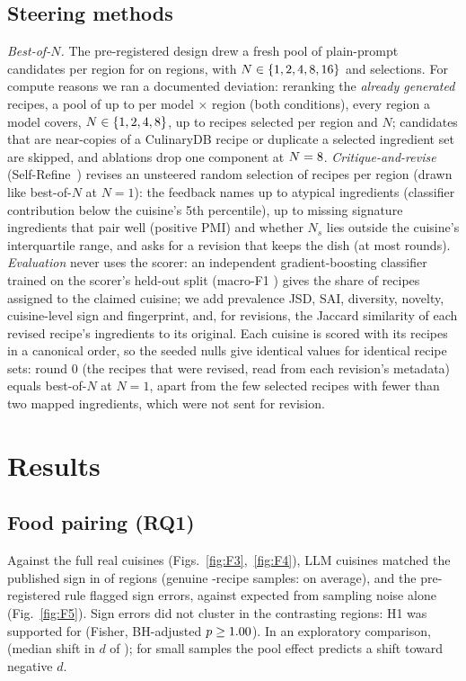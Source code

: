\documentclass[conference]{IEEEtran}
\newcommand{\Ns}{N_s}
\begin{document}
\subsection{Steering methods}
\emph{Best-of-$N$.} The pre-registered design drew a fresh pool of \NSteerPrePool{} plain-prompt candidates per region for \NSteerPreModels{} on \NSteerPreRegions{} regions, with $N\in\{1, 2, 4, 8, 16\}$ and \NSteerPreSelected{} selections. For compute reasons we ran a documented deviation: reranking the \emph{already generated} recipes, a pool of up to \NBonPoolMax{} per model $\times$ region (both conditions), every region a model covers, $N\in\{1, 2, 4, 8\}$, up to \NBonSelectedMax{} recipes selected per region and $N$; candidates that are near-copies of a CulinaryDB recipe or duplicate a selected ingredient set are skipped, and ablations drop one component at $N=8$.
\emph{Critique-and-revise} (Self-Refine~\cite{madaan2023}) revises an unsteered random selection of recipes per region (drawn like best-of-$N$ at $N=1$): the feedback names up to \NFeedbackItems{} atypical ingredients (classifier contribution below the cuisine's 5th percentile), up to \NFeedbackItems{} missing signature ingredients that pair well (positive PMI) and whether $\Ns$ lies outside the cuisine's interquartile range, and asks for a revision that keeps the dish (at most \NRoundsMax{} rounds).
\emph{Evaluation} never uses the scorer: an independent gradient-boosting classifier trained on the scorer's held-out split (macro-F1 \NEvalClfFOne) gives the share of recipes assigned to the claimed cuisine; we add prevalence JSD, SAI, diversity, novelty, cuisine-level sign and fingerprint, and, for revisions, the Jaccard similarity of each revised recipe's ingredients to its original. Each cuisine is scored with its recipes in a canonical order, so the seeded nulls give identical values for identical recipe sets: round 0 (the recipes that were revised, read from each revision's metadata) equals best-of-$N$ at $N=1$, apart from the few selected recipes with fewer than two mapped ingredients, which were not sent for revision.

\section{Results}
\subsection{Food pairing (RQ1)}
Against the full real cuisines (Figs.~\ref{fig:F3},~\ref{fig:F4}), LLM cuisines matched the published sign in \NSignAgreeRange{} of regions (genuine \NLLMN-recipe samples: \NRefSignMatchPct{} on average), and the pre-registered rule flagged \NSignErrText{} sign errors, against \NSignErrExpectedText{} expected from sampling noise alone (Fig.~\ref{fig:F5}). Sign errors did not cluster in the contrasting regions: H1 was supported for \NHOneFisherSupport{} (Fisher, BH-adjusted $p\geq1.00$). In an exploratory comparison, \NHOneExpDirection{} (median shift in $d$ of \NHOneExpShiftRange); for small samples the pool effect predicts a shift toward negative $d$.
\end{document}

